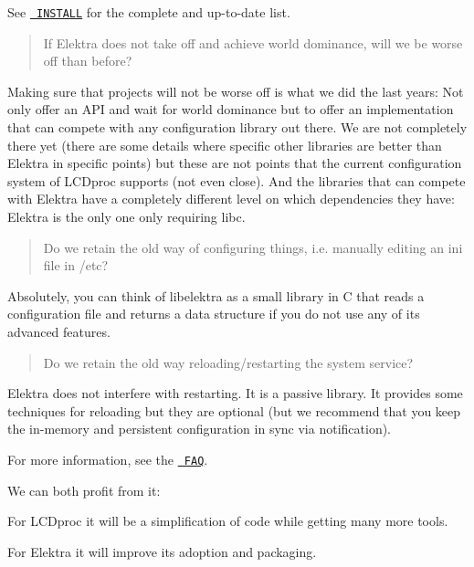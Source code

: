 See \href{https://www.libelektra.org/docgettingstarted/installation}{\texttt{ I\+N\+S\+T\+A\+LL}} for the complete and up-\/to-\/date list.

\begin{quote}
If Elektra does not take off and achieve world dominance, will we be worse off than before? \end{quote}


Making sure that projects will not be worse off is what we did the last years\+: Not only offer an A\+PI and wait for world dominance but to offer an implementation that can compete with any configuration library out there. We are not completely there yet (there are some details where specific other libraries are better than Elektra in specific points) but these are not points that the current configuration system of L\+C\+Dproc supports (not even close). And the libraries that can compete with Elektra have a completely different level on which dependencies they have\+: Elektra is the only one only requiring libc.

\begin{quote}
Do we retain the old way of configuring things, i.\+e. manually editing an ini file in /etc? \end{quote}


Absolutely, you can think of libelektra as a small library in C that reads a configuration file and returns a data structure if you do not use any of its advanced features.

\begin{quote}
Do we retain the old way reloading/restarting the system service? \end{quote}


Elektra does not interfere with restarting. It is a passive library. It provides some techniques for reloading but they are optional (but we recommend that you keep the in-\/memory and persistent configuration in sync via notification).

For more information, see the \href{https://www.libelektra.org/manpages/elektra-faq}{\texttt{ F\+AQ}}.

We can both profit from it\+:


\begin{DoxyEnumerate}
\item For L\+C\+Dproc it will be a simplification of code while getting many more tools.
\item For Elektra it will improve its adoption and packaging.
\end{DoxyEnumerate}

